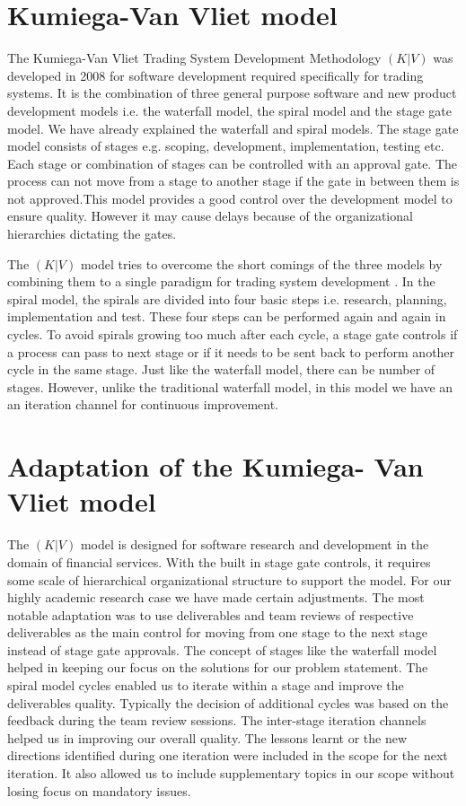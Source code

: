 \section{Kumiega-Van Vliet model}\label{kvvm}   
      
The Kumiega-Van Vliet Trading System Development Methodology \((K|V)\) was developed in 2008 for software development required specifically for trading systems. It is the combination of three general purpose software and new product development models i.e. the waterfall model, the spiral model and the stage gate model. We have already explained the waterfall and spiral models. The stage gate model consists of stages e.g. scoping, development, implementation, testing etc. Each stage or combination of stages can be controlled with an approval gate. The process can not move from a stage to another stage if the gate in between them is not approved.This model provides a good control over the development model to ensure quality. However it may cause delays because of the organizational hierarchies dictating the gates.

 The \((K|V)\) model tries to overcome the short comings of the three models by combining them to a single paradigm for trading system development \cite{kumiega2008software}. In the spiral model, the spirals are divided into four basic steps i.e. research, planning, implementation and test. These four steps can be performed again and again in cycles. To avoid spirals  growing too much after each cycle, a stage gate controls if a process can pass to next stage or if it needs to be sent back to perform another cycle in the same stage. Just like the waterfall model, there can be number of stages. However, unlike the traditional waterfall model, in this model we have an an iteration channel for continuous improvement.

 \section{Adaptation of the Kumiega- Van Vliet model}\label{adaptation}
 The \((K|V)\) model is designed for software research  and development in the domain of financial services. With the built in stage gate controls, it requires some scale of hierarchical organizational structure to support the model. For our highly academic research case we have made certain adjustments. The most notable adaptation was to use deliverables and team reviews of respective deliverables as the main control for moving from one stage to the next stage instead of stage gate approvals. The concept of stages like the waterfall model helped in keeping our focus on the solutions for our problem statement. The spiral model cycles enabled us to iterate within a stage and improve the deliverables quality. Typically the decision of additional cycles was based on the feedback during the team review sessions. The inter-stage iteration channels helped us in improving our overall quality. The lessons learnt or the new directions identified during one iteration were included in the scope for the next iteration. It also allowed us to include supplementary topics in our scope without losing focus on mandatory issues.
 
